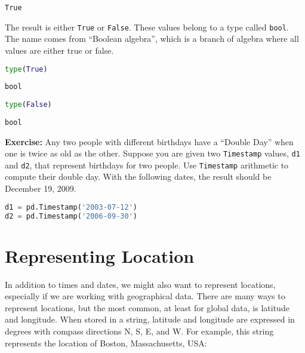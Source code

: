 \begin{lstlisting}[style=output]
True
\end{lstlisting}

The result is either \passthrough{\lstinline!True!} or
\passthrough{\lstinline!False!}. These values belong to a type called
\passthrough{\lstinline!bool!}. The name comes from ``Boolean algebra'',
which is a branch of algebra where all values are either true or false.

\begin{lstlisting}[language=Python,style=source]
type(True)
\end{lstlisting}

\begin{lstlisting}[style=output]
bool
\end{lstlisting}

\begin{lstlisting}[language=Python,style=source]
type(False)
\end{lstlisting}

\begin{lstlisting}[style=output]
bool
\end{lstlisting}

\textbf{Exercise:} Any two people with different birthdays have a
``Double Day'' when one is twice as old as the other. Suppose you are
given two \passthrough{\lstinline!Timestamp!} values,
\passthrough{\lstinline!d1!} and \passthrough{\lstinline!d2!}, that
represent birthdays for two people. Use
\passthrough{\lstinline!Timestamp!} arithmetic to compute their double
day. With the following dates, the result should be December 19, 2009.

\begin{lstlisting}[language=Python,style=source]
d1 = pd.Timestamp('2003-07-12')
d2 = pd.Timestamp('2006-09-30')
\end{lstlisting}

\section{Representing Location}\label{representing-location}

In addition to times and dates, we might also want to represent
locations, especially if we are working with geographical data. There
are many ways to represent locations, but the most common, at least for
global data, is latitude and longitude. When stored in a string,
latitude and longitude are expressed in degrees with compass directions
N, S, E, and W. For example, this string represents the location of
Boston, Massachusetts, USA:

